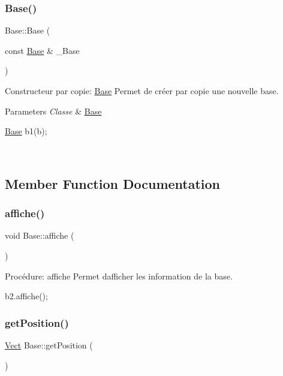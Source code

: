 \subsubsection{\texorpdfstring{Base()}{Base()}\hspace{0.1cm}{\footnotesize\ttfamily [3/3]}}
{\footnotesize\ttfamily Base\+::\+Base (\begin{DoxyParamCaption}\item[{const \hyperlink{classBase}{Base} \&}]{\+\_\+\+Base }\end{DoxyParamCaption})}



Constructeur par copie\+: \hyperlink{classBase}{Base} Permet de créer par copie une nouvelle base. 


\begin{DoxyParams}{Parameters}
{\em Classe} & \hyperlink{classBase}{Base} 
\begin{DoxyCode}
\hyperlink{classBase}{Base} b1(b);
\end{DoxyCode}
 \\
\hline
\end{DoxyParams}


\subsection{Member Function Documentation}
\mbox{\label{classBase_a90f460bea595fc507cab1b6a2131350c}} 
\subsubsection{\texorpdfstring{affiche()}{affiche()}}
{\footnotesize\ttfamily void Base\+::affiche (\begin{DoxyParamCaption}{ }\end{DoxyParamCaption})}



Procédure\+: affiche Permet d\textquotesingle{}afficher les information de la base. 


\begin{DoxyCode}
b2.affiche();
\end{DoxyCode}
 \mbox{\label{classBase_a16d0ed1836dfedfb51d54308d22b4a38}} 
\subsubsection{\texorpdfstring{get\+Position()}{getPosition()}}
{\footnotesize\ttfamily \hyperlink{classVect}{Vect} Base\+::get\+Position (\begin{DoxyParamCaption}{ }\end{DoxyParamCaption})}




